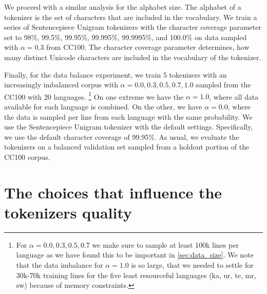 We proceed with a similar analysis for the alphabet size. The alphabet of a tokenizer is the set of characters that are included in the vocabulary. We train a series of Sentencepiece Unigram tokenizers with the character coverage parameter set to 98\%, 99.5\%, 99.95\%, 99.995\%, 99.9995\%, and 100.0\% on data sampled with $\alpha=0.3$ from CC100. The character coverage parameter determines, how many distinct Unicode characters are included in the vocabulary of the tokenizer.

Finally, for the data balance experiment, we train 5 tokenizers with an increasingly imbalanced corpus with $\alpha = 0.0, 0.3, 0.5, 0.7, 1.0$ sampled from the CC100 with 20 languages. \footnote{For $\alpha = 0.0, 0.3, 0.5, 0.7$ we make sure to sample at least 100k lines per language as we have found this to be important in \autoref{sec:data_size}. We note that the data imbalance for $\alpha=1.0$ is so large, that we needed to settle for 30k-70k training lines for the five least resourceful languages (ka, ur, te, mr, sw) because of memory constraints.} On one extreme we have the $\alpha=1.0$, where all data available for each language is combined. On the other, we have $\alpha=0.0$, where the data is sampled per line from each language with the same probability. We use the Sentencepiece Unigram tokenizer with the default settings. Specifically, we use the default character coverage of 99.95\%. As usual, we evaluate the tokenizers on a balanced validation set sampled from a holdout portion of the CC100 corpus. 


\section{The choices that influence the tokenizers quality}

